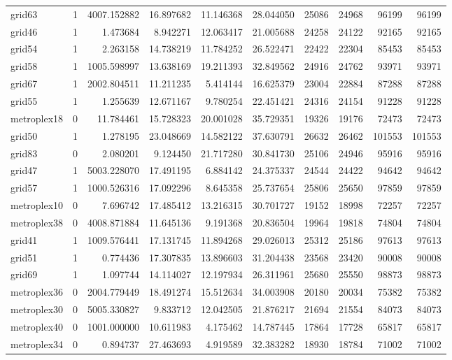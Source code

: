 \begin{longtable}{|l|r|r|r|r|r|r|r|r|r|}
grid63 & 1 & 4007.152882 & 16.897682 & 11.146368 & 28.044050 & 25086 & 24968 & 96199 & 96199 \\
grid46 & 1 & 1.473684 & 8.942271 & 12.063417 & 21.005688 & 24258 & 24122 & 92165 & 92165 \\
grid54 & 1 & 2.263158 & 14.738219 & 11.784252 & 26.522471 & 22422 & 22304 & 85453 & 85453 \\
grid58 & 1 & 1005.598997 & 13.638169 & 19.211393 & 32.849562 & 24916 & 24762 & 93971 & 93971 \\
grid67 & 1 & 2002.804511 & 11.211235 & 5.414144 & 16.625379 & 23004 & 22884 & 87288 & 87288 \\
grid55 & 1 & 1.255639 & 12.671167 & 9.780254 & 22.451421 & 24316 & 24154 & 91228 & 91228 \\
metroplex18 & 0 & 11.784461 & 15.728323 & 20.001028 & 35.729351 & 19326 & 19176 & 72473 & 72473 \\
grid50 & 1 & 1.278195 & 23.048669 & 14.582122 & 37.630791 & 26632 & 26462 & 101553 & 101553 \\
grid83 & 0 & 2.080201 & 9.124450 & 21.717280 & 30.841730 & 25106 & 24946 & 95916 & 95916 \\
grid47 & 1 & 5003.228070 & 17.491195 & 6.884142 & 24.375337 & 24544 & 24422 & 94642 & 94642 \\
grid57 & 1 & 1000.526316 & 17.092296 & 8.645358 & 25.737654 & 25806 & 25650 & 97859 & 97859 \\
metroplex10 & 0 & 7.696742 & 17.485412 & 13.216315 & 30.701727 & 19152 & 18998 & 72257 & 72257 \\
metroplex38 & 0 & 4008.871884 & 11.645136 & 9.191368 & 20.836504 & 19964 & 19818 & 74804 & 74804 \\
grid41 & 1 & 1009.576441 & 17.131745 & 11.894268 & 29.026013 & 25312 & 25186 & 97613 & 97613 \\
grid51 & 1 & 0.774436 & 17.307835 & 13.896603 & 31.204438 & 23568 & 23420 & 90008 & 90008 \\
grid69 & 1 & 1.097744 & 14.114027 & 12.197934 & 26.311961 & 25680 & 25550 & 98873 & 98873 \\
metroplex36 & 0 & 2004.779449 & 18.491274 & 15.512634 & 34.003908 & 20180 & 20034 & 75382 & 75382 \\
metroplex30 & 0 & 5005.330827 & 9.833712 & 12.042505 & 21.876217 & 21694 & 21554 & 84073 & 84073 \\
metroplex40 & 0 & 1001.000000 & 10.611983 & 4.175462 & 14.787445 & 17864 & 17728 & 65817 & 65817 \\
metroplex34 & 0 & 0.894737 & 27.463693 & 4.919589 & 32.383282 & 18930 & 18784 & 71002 & 71002 \\

\end{longtable}
